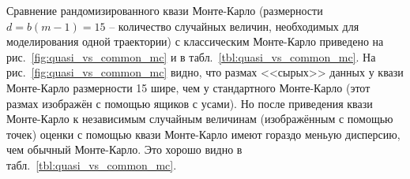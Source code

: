 \documentclass[specialist,
               substylefile = ../spbu.rtx,
               subf,href,colorlinks=true, 12pt]{disser}
\newcommand{\prob}[1]{\mathrm{P}\left(#1\right)}
\begin{document}
Сравнение рандомизированного квази Монте-Карло (размерности $d = b(m-1) = 15$ -- количество случайных величин, необходимых для моделирования одной траектории) с классическим Монте-Карло приведено на рис.~\ref{fig:quasi_vs_common_mc} и в табл.~\ref{tbl:quasi_vs_common_mc}. На рис.~\ref{fig:quasi_vs_common_mc} видно, что размах <<сырых>> данных у квази Монте-Карло размерности 15 шире, чем у стандартного Монте-Карло (этот размах изображён с помощью ящиков с усами). Но после приведения квази Монте-Карло к независимым случайным величинам (изображённым с помощью точек) оценки с помощью квази Монте-Карло имеют гораздо меньую дисперсию, чем обычный Монте-Карло. Это хорошо видно в табл.~\ref{tbl:quasi_vs_common_mc}.




\end{document}
